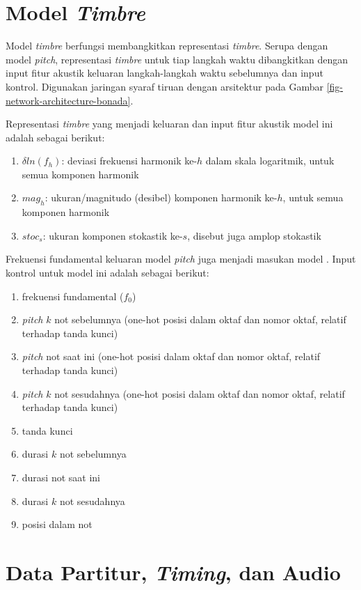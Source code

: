 \section{Model \textit{Timbre}}

Model \textit{timbre} berfungsi membangkitkan representasi \textit{timbre}. Serupa dengan model \textit{pitch}, representasi \textit{timbre} untuk tiap langkah waktu dibangkitkan dengan input fitur akustik keluaran langkah-langkah waktu sebelumnya dan input kontrol. Digunakan jaringan syaraf tiruan dengan arsitektur pada Gambar \ref{fig-network-architecture-bonada}.

Representasi \textit{timbre} yang menjadi keluaran dan input fitur akustik model ini adalah sebagai berikut:

\begin{enumerate}
    \item $\delta ln(f_h)$: deviasi frekuensi harmonik ke-$h$ dalam skala logaritmik, untuk semua komponen harmonik
    \item $mag_h$: ukuran/magnitudo (desibel) komponen harmonik ke-$h$, untuk semua komponen harmonik
    \item $stoc_s$: ukuran komponen stokastik ke-$s$, disebut juga amplop stokastik
\end{enumerate}

Frekuensi fundamental keluaran model \textit{pitch} juga menjadi masukan model . Input kontrol untuk model ini adalah sebagai berikut:
\begin{enumerate}
    \item frekuensi fundamental ($f_0$)
    \item \textit{pitch} $k$ not sebelumnya (one-hot posisi dalam oktaf dan nomor oktaf, relatif terhadap tanda kunci)
    \item \textit{pitch} not saat ini (one-hot posisi dalam oktaf dan nomor oktaf, relatif terhadap tanda kunci)
    \item \textit{pitch} $k$ not sesudahnya (one-hot posisi dalam oktaf dan nomor oktaf, relatif terhadap tanda kunci)
    \item tanda kunci
    \item durasi $k$ not sebelumnya
    \item durasi not saat ini
    \item durasi $k$ not sesudahnya
    \item posisi dalam not
\end{enumerate}

\section{Data Partitur, \textit{Timing}, dan Audio} \label{datacollectionsection}

